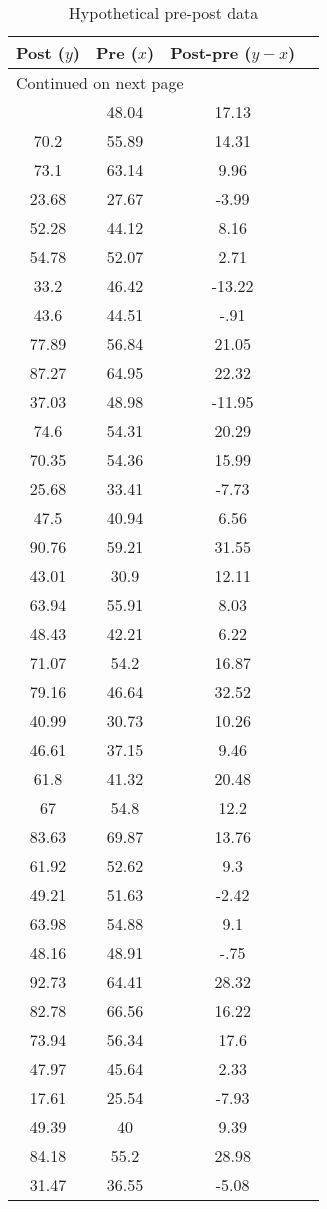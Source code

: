 \newpage
\begin{longtable}{cccc}
\caption{Hypothetical pre-post data \label{tab:prepostdata}} \\
Post ($y$) & Pre ($x$) & Post-pre ($y-x$)  \\
\hline
\endhead
\hline \multicolumn{3}{l}{{Continued on next page}} \\ \hline
\endfoot
\endlastfoot
65.17&48.04&17.13\\
70.2&55.89&14.31\\
73.1&63.14&9.96\\
23.68&27.67&-3.99\\
52.28&44.12&8.16\\
54.78&52.07&2.71\\
33.2&46.42&-13.22\\
43.6&44.51&-.91\\
77.89&56.84&21.05\\
87.27&64.95&22.32\\
37.03&48.98&-11.95\\
74.6&54.31&20.29\\
70.35&54.36&15.99\\
25.68&33.41&-7.73\\
47.5&40.94&6.56\\
90.76&59.21&31.55\\
43.01&30.9&12.11\\
63.94&55.91&8.03\\
48.43&42.21&6.22\\
71.07&54.2&16.87\\
79.16&46.64&32.52\\
40.99&30.73&10.26\\
46.61&37.15&9.46\\
61.8&41.32&20.48\\
67&54.8&12.2\\
83.63&69.87&13.76\\
61.92&52.62&9.3\\
49.21&51.63&-2.42\\
63.98&54.88&9.1\\
48.16&48.91&-.75\\
92.73&64.41&28.32\\
82.78&66.56&16.22\\
73.94&56.34&17.6\\
47.97&45.64&2.33\\
17.61&25.54&-7.93\\
49.39&40&9.39\\
84.18&55.2&28.98\\
31.47&36.55&-5.08\\

\end{longtable}
